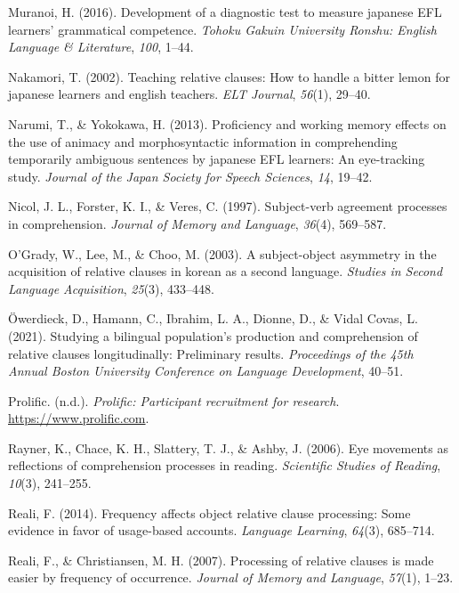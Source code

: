 \documentclass[
]{article}
\newlength{\cslhangindent}
\newenvironment{CSLReferences}[2] %
 {\begin{list}{}{%
  \setlength{\itemindent}{0pt}
  \setlength{\leftmargin}{0pt}
  \setlength{\parsep}{0pt}
  \ifodd #1
   \setlength{\leftmargin}{\cslhangindent}
   \setlength{\itemindent}{-1\cslhangindent}
  \fi
  \setlength{\itemsep}{#2\baselineskip}}}
 {\end{list}}
\begin{document}
\begin{CSLReferences}{1}{0}
Muranoi, H. (2016). Development of a diagnostic test to measure japanese
EFL learners' grammatical competence. \emph{Tohoku Gakuin University
Ronshu: English Language \& Literature}, \emph{100}, 1--44.

Nakamori, T. (2002). Teaching relative clauses: How to handle a bitter
lemon for japanese learners and english teachers. \emph{ELT Journal},
\emph{56}(1), 29--40.

Narumi, T., \& Yokokawa, H. (2013). Proficiency and working memory
effects on the use of animacy and morphosyntactic information in
comprehending temporarily ambiguous sentences by japanese EFL learners:
An eye-tracking study. \emph{Journal of the Japan Society for Speech
Sciences}, \emph{14}, 19--42.

Nicol, J. L., Forster, K. I., \& Veres, C. (1997). Subject-verb
agreement processes in comprehension. \emph{Journal of Memory and
Language}, \emph{36}(4), 569--587.

O'Grady, W., Lee, M., \& Choo, M. (2003). A subject-object asymmetry in
the acquisition of relative clauses in korean as a second language.
\emph{Studies in Second Language Acquisition}, \emph{25}(3), 433--448.

Öwerdieck, D., Hamann, C., Ibrahim, L. A., Dionne, D., \& Vidal Covas,
L. (2021). Studying a bilingual population's production and
comprehension of relative clauses longitudinally: Preliminary results.
\emph{Proceedings of the 45th Annual Boston University Conference on
Language Development}, 40--51.

Prolific. (n.d.). \emph{Prolific: Participant recruitment for research}.
\url{https://www.prolific.com}.

Rayner, K., Chace, K. H., Slattery, T. J., \& Ashby, J. (2006). Eye
movements as reflections of comprehension processes in reading.
\emph{Scientific Studies of Reading}, \emph{10}(3), 241--255.

Reali, F. (2014). Frequency affects object relative clause processing:
Some evidence in favor of usage-based accounts. \emph{Language
Learning}, \emph{64}(3), 685--714.

Reali, F., \& Christiansen, M. H. (2007). Processing of relative clauses
is made easier by frequency of occurrence. \emph{Journal of Memory and
Language}, \emph{57}(1), 1--23.


\end{CSLReferences}
\end{document}
